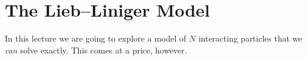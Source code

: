 \section{The Lieb--Liniger Model}

In this lecture we are going to explore a model of $N$ interacting particles that we \emph{can} solve exactly. This comes at a price, however.